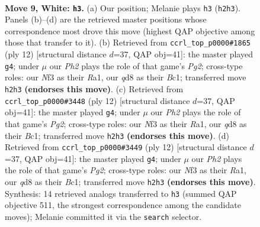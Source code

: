 \documentclass[11pt]{article}
\begin{document}
\clearpage

\begin{figure}[p]\centering
\begin{subfigure}{0.46\textwidth}\centering
\resizebox{\linewidth}{!}{%
\newchessgame
\chessboard[
  setfen={rnbqk2r/1p2bpp1/4pn2/p1Pp3p/3P4/2N2N2/PP3PPP/R1BQKBR1 w Qkq - 0 9},
  showmover=false,
  pgfstyle=straightmove, color=movearrow, markmove={h2-h3}
]}
\caption{}
\end{subfigure}\hfill
\begin{subfigure}{0.46\textwidth}\centering
\resizebox{\linewidth}{!}{%
\newchessgame
\chessboard[
  setfen={rnbqkb1r/1p3ppp/p2ppn2/8/3NP3/2N4P/PPP2PP1/R1BQKB1R w KQkq - 0 7},
  showmover=false,
  pgfstyle=straightmove, color=movearrow, markmove={g2-g4}
]}
\caption{}
\end{subfigure}
\\[4pt]
\begin{subfigure}{0.46\textwidth}\centering
\resizebox{\linewidth}{!}{%
\newchessgame
\chessboard[
  setfen={rnbqkb1r/1p3ppp/p2ppn2/8/3NP3/2N4P/PPP2PP1/R1BQKB1R w KQkq - 0 7},
  showmover=false,
  pgfstyle=straightmove, color=movearrow, markmove={g2-g4}
]}
\caption{}
\end{subfigure}\hfill
\begin{subfigure}{0.46\textwidth}\centering
\resizebox{\linewidth}{!}{%
\newchessgame
\chessboard[
  setfen={rnbqkb1r/1p3ppp/p2ppn2/8/3NP3/2N4P/PPP2PP1/R1BQKB1R w KQkq - 0 7},
  showmover=false,
  pgfstyle=straightmove, color=movearrow, markmove={g2-g4}
]}
\caption{}
\end{subfigure}
\caption{\textbf{Move 9, White: \texttt{h3}.} (a) Our position; Melanie plays \texttt{h3} (\texttt{h2h3}). Panels (b)--(d) are the retrieved master positions whose correspondence most drove this move (highest QAP objective among those that transfer to it). (b) Retrieved from \texttt{ccrl\_top\_p0000\#1865} (ply 12) [structural distance $d$=37, QAP obj=41]: the master played \texttt{g4}; under $\mu$ our \emph{Ph2} plays the role of that game's \emph{Pg2}; cross-type roles: our \emph{N}f3 as their \emph{R}a1, our \emph{q}d8 as their \emph{B}c1; transferred move \texttt{h2h3} \textbf{(endorses this move)}. (c) Retrieved from \texttt{ccrl\_top\_p0000\#3448} (ply 12) [structural distance $d$=37, QAP obj=41]: the master played \texttt{g4}; under $\mu$ our \emph{Ph2} plays the role of that game's \emph{Pg2}; cross-type roles: our \emph{N}f3 as their \emph{R}a1, our \emph{q}d8 as their \emph{B}c1; transferred move \texttt{h2h3} \textbf{(endorses this move)}. (d) Retrieved from \texttt{ccrl\_top\_p0000\#3449} (ply 12) [structural distance $d$=37, QAP obj=41]: the master played \texttt{g4}; under $\mu$ our \emph{Ph2} plays the role of that game's \emph{Pg2}; cross-type roles: our \emph{N}f3 as their \emph{R}a1, our \emph{q}d8 as their \emph{B}c1; transferred move \texttt{h2h3} \textbf{(endorses this move)}. Synthesis: 14 retrieved analogs transferred to \texttt{h3} (summed QAP objective 511, the strongest correspondence among the candidate moves); Melanie committed it via the \texttt{search} selector.}
\label{fig:thought-m16}
\end{figure}
\end{document}
